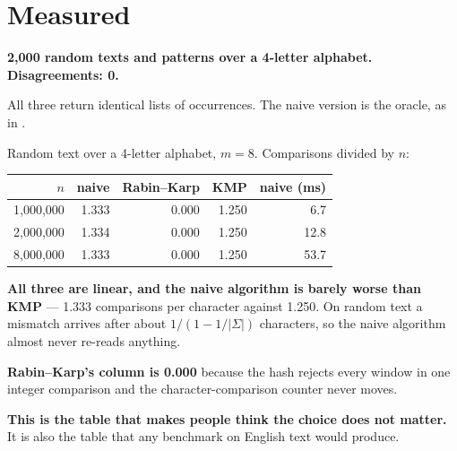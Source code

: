 \section{Measured}

\begin{worked}
\begin{center}
\textbf{2{,}000 random texts and patterns over a 4-letter alphabet.
Disagreements: 0.}
\end{center}
All three return identical lists of occurrences. The naive version is the
oracle, as in .
\end{worked}

\begin{worked}
Random text over a 4-letter alphabet, $m = 8$. Comparisons divided by $n$:

\begin{center}
\begin{tabular}{@{}rrrrr@{}}
\toprule
\rowcolor{primary!15}
$n$ & naive & Rabin--Karp & KMP & naive (ms) \\
\midrule
1{,}000{,}000 & 1.333 & 0.000 & 1.250 &  6.7 \\
2{,}000{,}000 & 1.334 & 0.000 & 1.250 & 12.8 \\
8{,}000{,}000 & 1.333 & 0.000 & 1.250 & 53.7 \\
\bottomrule
\end{tabular}
\end{center}

\smallskip
\textbf{All three are linear, and the naive algorithm is barely worse than
KMP} --- 1.333 comparisons per character against 1.250. On random text a
mismatch arrives after about $1/(1-1/|\Sigma|)$ characters, so the naive
algorithm almost never re-reads anything.

\smallskip
\textbf{Rabin--Karp's column is 0.000} because the hash rejects every window in
one integer comparison and the character-comparison counter never moves.

\smallskip
\textbf{This is the table that makes people think the choice does not matter.}
It is also the table that any benchmark on English text would produce.
\end{worked}


